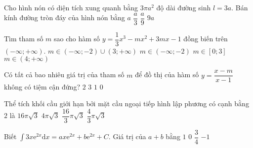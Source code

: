 \begin{ex}%
Cho hình nón có diện tích xung quanh bằng $3\pi a^2$ độ dài đường sinh $l = 3a$. Bán kính đường tròn đáy của hình nón bằng
\choice
{\True $a$}
{$\dfrac{a}{3}$}
{$\dfrac{a}{9}$}
{$9a$}
\end{ex}

\begin{ex}%
Tìm tham số $m$ sao cho hàm số $y=\dfrac{1}{3}x^3-mx^2+3mx-1$ đồng biến trên $(-\infty;+\infty).$
\choice
{$m\in (-\infty;-2) \cup (3;+\infty)$}
{$m\in (-\infty;-2)$}
{\True $m \in [0;3]$}
{$m\in (4;+\infty)$}
\end{ex}

\begin{ex}%
Có tất cả bao nhiêu giá trị của tham số $m$ để đồ thị của hàm số $y=\dfrac{x-m}{x-1}$ không có tiệm cận đứng?
\choice
{$2$}
{$3$}
{\True $1$}
{$0$}
\end{ex}

\begin{ex}%
Thể tích khối cầu giới hạn bởi mặt cầu ngoại tiếp hình lập phương có cạnh bằng $2$ là
\choice
{$16\pi \sqrt{3}$}
{\True $4\pi \sqrt{3}$}
{$\dfrac{16}{3}\pi \sqrt{3}$}
{$\dfrac{4}{3}\pi \sqrt{3}$}
\end{ex}

\begin{ex}%
Biết $\displaystyle \int 3x\mathrm{e}^{2x} \mathrm{d}x=ax\mathrm{e}^{2x} +b\mathrm{e}^{2x} +C.$ Giá trị của $a+b$ bằng
\choice
{$1$}
{$0$}
{\True $\dfrac{3}{4}$}
{$-1$}
\end{ex}

